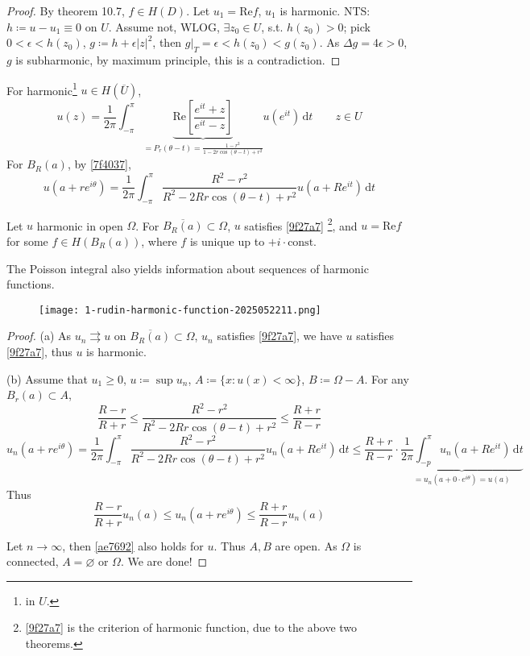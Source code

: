 \begin{proof}
By theorem 10.7, $f\in H(D)$. Let $u_1=\mathrm{Re}f$, $u_1$ is harmonic. NTS: $h\coloneqq u-u_1\equiv0$ on $U$. Assume not, WLOG, $\exists z_0\in U$, s.t. $h(z_0)>0$; pick $0<\epsilon<h(z_0)$, $g\coloneqq h+\epsilon \lvert z \rvert ^2$, then $g|_{T}=\epsilon<h(z_0)<g(z_0)$. As $\Delta g=4\epsilon>0$, $g$ is subharmonic, by maximum principle, this is a contradiction.
\end{proof}

For harmonic\footnote{in $U$.} $u\in H(\overline{U})$,
\[
u(z)=\frac{1}{2\pi}\int_{-\pi}^{\pi} \underbrace{ \mathrm{Re}\left[ \frac{e^{ it }+z}{e^{ it }-z} \right] }_{ =P_{r}(\theta-t)= \frac{1-r^2}{1-2r\cos(\theta-t)+r^2}}u(e^{ it }) \, \mathrm{d}t\qquad z\in U
\]
For $B_{R}(a)$, by \cref{7f4037},
\begin{equation}
u(a+re^{ i\theta })=\frac{1}{2\pi}\int_{-\pi}^{\pi} \frac{R^2-r^2}{R^2-2Rr\cos(\theta-t)+r^2}u(a+R e^{ it }) \, \mathrm{d}t
\label{9f27a7}
\end{equation}

Let $u$ harmonic in open $\Omega$. For $\overline{B_R(a)}\subset \Omega$, $u$ satisfies \cref{9f27a7} \footnote{ \cref{9f27a7} is the criterion of harmonic function, due to the above two theorems.}, and $u=\mathrm{Re}f$ for some $f\in H(B_{R}(a))$, where $f$ is unique up to $+i\cdot\text{const.}$

The Poisson integral also yields information about sequences of harmonic functions.
\begin{figure}[H]
\centering
\texttt{[image: 1-rudin-harmonic-function-2025052211.png]}
\label{}
\end{figure}

\begin{proof}
(a) As $u_n\rightrightarrows u$ on $\overline{B_{R}(a)}\subset \Omega$, $u_n$ satisfies \cref{9f27a7}, we have $u$ satisfies  \cref{9f27a7}, thus $u$ is harmonic.

(b) Assume that $u_1\geq0$, $u\coloneqq \sup u_n$, $A\coloneqq \{ x:u(x)<\infty \}$, $B\coloneqq\Omega-A$. For any $B_{r}(a)\subset A$,
\[
\frac{R-r}{R+r}\leq \frac{R^2-r^2}{R^2-2Rr\cos(\theta-t)+r^2}\leq \frac{R+r}{R-r}
\]
\[
u_n(a+re^{ i\theta })=\frac{1}{2\pi}\int_{-\pi}^{\pi}  \frac{R^2-r^2}{R^2-2Rr\cos(\theta-t)+r^2}u_n(a+R e^{ it }) \, \mathrm{d}t \leq\frac{R+r}{R-r}\cdot\underbrace{ \frac{1}{2\pi}\int_{-p}^{\pi} u_n(a+R e^{ it }) \, \mathrm{d}t }_{ =u_n(a+0\cdot e^{ i\theta })=u(a) }  
\]
Thus
\begin{equation}
\frac{R-r}{R+r}u_n(a)\leq u_n(a+re^{ i\theta })\leq \frac{R+r}{R-r}u_n(a)
\label{ae7692}
\end{equation}

Let $n\to \infty$, then \cref{ae7692} also holds for $u$. Thus $A,B$ are open. As $\Omega$ is connected, $A=\varnothing$ or $\Omega$. We are done!
\end{proof}

